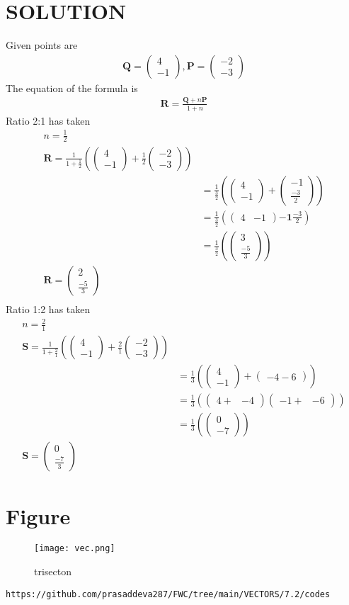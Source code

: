 \documentclass[12pt]{article}
\providecommand{\brak}[1]{\ensuremath{\left(#1\right)}}
\newcommand{\myvec}[1]{\ensuremath{\begin{pmatrix}#1\end{pmatrix}}}
\let\vec\mathbf
\begin{document}
\section{SOLUTION}
Given points are
\begin{align}
\vec{Q}=\myvec{4\\ -1} ,
\vec{P}=\myvec{-2\\ -3}
\end{align}
The equation of the formula is
\begin{align}
\vec{R}=\frac{\vec{Q}+n\vec{P}}{1+n}
\end{align}
Ratio 2:1 has taken 
\begin{align}
n=\frac{1}{2}\\
\vec{R}=\frac{1}{1+\frac{1}{2}}\brak{\myvec{4\\-1}+\frac{1}{2}\myvec{-2\\-3}}\\
&=\frac{1}{\frac{3}{2}}\brak{\myvec{4\\ -1}+\myvec{-1\\ \frac{-3}{2}}}\\
&=\frac{1}{\frac{3}{2}}\brak {\myvec{4&-1} {\vec{-1} \frac{-3}{2}}}\\
&=\frac{1}{\frac{3}{2}}\brak {\myvec{3\\ \frac{-5}{3}}}\\
\vec{R}=\myvec{2\\ \frac{-5}{3}}\\
\end{align}
Ratio 1:2 has taken
\begin{align}
n=\frac{2}{1}\\
\vec{S}=\frac{1}{1+\frac{2}{1}}\brak{\myvec{4\\-1}+\frac{2}{1}\myvec{-2\\-3}}\\
&=\frac{1}{3}\brak{\myvec{4\\ -1}+\myvec{-4-6}}\\
&=\frac{1}{3}\brak{\myvec{4+& -4}\myvec{-1+&-6}}\\
&=\frac{1}{3}\brak{\myvec{0\\ -7}}\\
\vec{S}=\myvec{0\\ \frac{-7}{3}}
\end{align}
\section{Figure}
\begin{figure}[h]
\centering
\texttt{[image: vec.png]}
\caption{trisecton}
		\label{fig:Figure}
\end{figure}
\begin{lstlisting}
https://github.com/prasaddeva287/FWC/tree/main/VECTORS/7.2/codes
\end{lstlisting}
\end{document}
